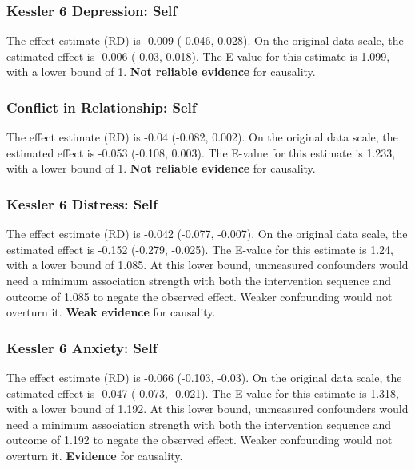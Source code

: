 \documentclass[
  singlecolumn]{article}
\begin{document}
\subsubsection{Kessler 6 Depression:
Self}\label{kessler-6-depression-self-3}

The effect estimate (RD) is -0.009 (-0.046, 0.028). On the original data
scale, the estimated effect is -0.006 (-0.03, 0.018). The E-value for
this estimate is 1.099, with a lower bound of 1. \textbf{Not reliable
evidence} for causality.

\subsubsection{Conflict in Relationship:
Self}\label{conflict-in-relationship-self-3}

The effect estimate (RD) is -0.04 (-0.082, 0.002). On the original data
scale, the estimated effect is -0.053 (-0.108, 0.003). The E-value for
this estimate is 1.233, with a lower bound of 1. \textbf{Not reliable
evidence} for causality.

\subsubsection{Kessler 6 Distress:
Self}\label{kessler-6-distress-self-3}

The effect estimate (RD) is -0.042 (-0.077, -0.007). On the original
data scale, the estimated effect is -0.152 (-0.279, -0.025). The E-value
for this estimate is 1.24, with a lower bound of 1.085. At this lower
bound, unmeasured confounders would need a minimum association strength
with both the intervention sequence and outcome of 1.085 to negate the
observed effect. Weaker confounding would not overturn it. \textbf{Weak
evidence} for causality.

\subsubsection{Kessler 6 Anxiety: Self}\label{kessler-6-anxiety-self-3}

The effect estimate (RD) is -0.066 (-0.103, -0.03). On the original data
scale, the estimated effect is -0.047 (-0.073, -0.021). The E-value for
this estimate is 1.318, with a lower bound of 1.192. At this lower
bound, unmeasured confounders would need a minimum association strength
with both the intervention sequence and outcome of 1.192 to negate the
observed effect. Weaker confounding would not overturn it.
\textbf{Evidence} for causality.
\end{document}
